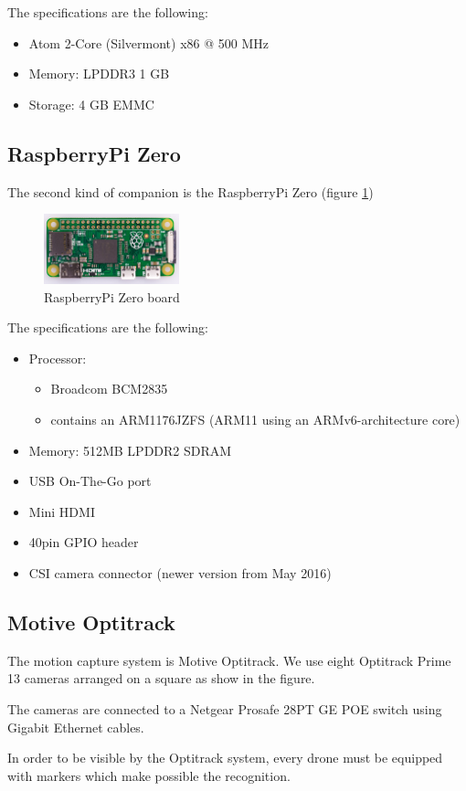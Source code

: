 The specifications are the following:

\begin{itemize}
  \item Atom 2-Core (Silvermont) x86 @ 500 MHz
  \item Memory: LPDDR3 1 GB
  \item Storage: 4 GB EMMC
\end{itemize}

\subsection{RaspberryPi Zero}
The second kind of companion is the RaspberryPi Zero (figure \ref{fig:hardware_raspberry})

\begin{figure}[h]
\centering
\includegraphics[width=0.35\textwidth]{chapters/chapter-03/figures/hardware_raspberry.jpg}
\caption{RaspberryPi Zero board}
\label{fig:hardware_raspberry}
\end{figure}

The specifications are the following:

\begin{itemize}
  \item Processor:
        \begin{itemize}
          \item Broadcom BCM2835
          \item contains an ARM1176JZFS (ARM11 using an ARMv6-architecture core)
        \end{itemize}

  \item Memory: 512MB LPDDR2 SDRAM

  \item USB On-The-Go port
  \item Mini HDMI
  \item 40pin GPIO header
  \item CSI camera connector (newer version from May 2016)
\end{itemize}

\subsection{Motive Optitrack}
The motion capture system is Motive Optitrack. %
We use eight Optitrack Prime 13 cameras %
arranged on a square as show in the figure. %

The cameras are connected to a Netgear Prosafe 28PT GE POE switch using %
Gigabit Ethernet cables.

In order to be visible by the Optitrack system, every drone must be equipped with
markers which make possible the recognition. %
